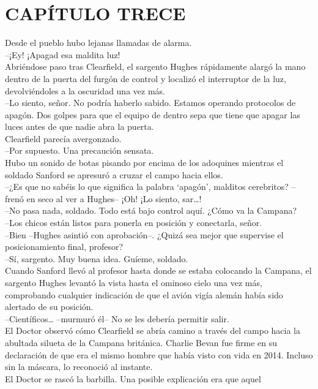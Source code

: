 \chapter*{CAPÍTULO TRECE}
Desde el pueblo hubo lejanas llamadas de alarma.\\
--¡Ey! ¡Apagad esa maldita luz!\\
Abriéndose paso tras Clearfield, el sargento Hughes rápidamente alargó
la mano dentro de la puerta del furgón de control y localizó el
interruptor de la luz, devolviéndoles a la oscuridad una vez más.\\
--Lo siento, señor. No podría haberlo sabido. Estamos operando
protocolos de apagón. Dos golpes para que el equipo de dentro sepa que
tiene que apagar las luces antes de que nadie abra la puerta.\\
Clearfield parecía avergonzado.\\
--Por supuesto. Una precaución sensata.\\
Hubo un sonido de botas pisando por encima de los adoquines mientras el
soldado Sanford se apresuró a cruzar el campo hacia ellos.\\
--¿Es que no sabéis lo que significa la palabra `apagón', malditos
cerebritos? --frenó en seco al ver a Hughes-- ¡Oh! ¡Lo siento,
sar\ldots{}!\\
--No pasa nada, soldado. Todo está bajo control aquí. ¿Cómo va la
Campana?\\
--Los chicos están listos para ponerla en posición y conectarla,
señor.\\
--Bien --Hughes asintió con aprobación--. ¿Quizá sea mejor que supervise
el posicionamiento final, profesor?\\
--Sí, sargento. Muy buena idea. Guíeme, soldado.\\
Cuando Sanford llevó al profesor hasta donde se estaba colocando la
Campana, el sargento Hughes levantó la vista hasta el ominoso cielo una
vez más, comprobando cualquier indicación de que el avión vigía alemán
había sido alertado de su posición.\\
--Científicos\ldots{} --murmuró él-- No se les debería permitir
salir.\\[2\baselineskip]El Doctor observó cómo Clearfield se abría
camino a través del campo hacia la abultada silueta de la Campana
británica. Charlie Bevan fue firme en su declaración de que era el mismo
hombre que había visto con vida en 2014. Incluso sin la máscara, lo
reconoció al instante.\\
El Doctor se rascó la barbilla. Una posible explicación era que aquel
